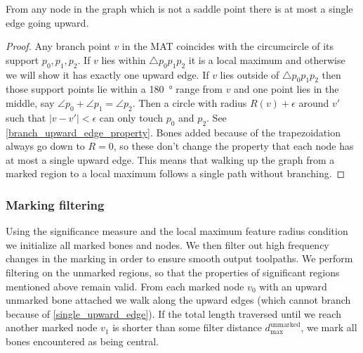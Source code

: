 \begin{lemma}\label{single_upward_edge}
From any node in the graph which is not a saddle point there is at most a single edge going upward.
\end{lemma}
\begin{proof}
Any branch point $v$ in the MAT coincides with the circumcircle of its support $p_0, p_1, p_2$.
If $v$ lies within $\triangle p_0 p_1 p_2$ it is a local maximum and otherwise we will show it has exactly one upward edge.
If $v$ lies outside of $\triangle p_0 p_1 p_2$ then those support points lie within a \SI{180}{\degree} range from $v$
and one point lies in the middle, say $\angle p_0 + \angle p_1 = \angle p_2$.
Then a circle with radius $R(v) + \epsilon$ around $v'$ such that $|v-v'| < \epsilon$ can only touch $p_0$ and $p_2$.
See \cref{branch_upward_edge_property}.
Bones added because of the trapezoidation always go down to $R=0$, so these don't change the property that each node has at most a single upward edge.
This means that walking up the graph from a marked region to a local maximum follows a single path without branching.
\end{proof}

\subsubsection{Marking filtering}
Using the significance measure and the local maximum feature radius condition we initialize all marked bones and nodes.
We then filter out high frequency changes in the marking in order to ensure smooth output toolpaths. 
We perform filtering on the unmarked regions, so that the properties of significant regions mentioned above remain valid.
From each marked node $v_0$ with an upward unmarked bone attached we walk along the upward edges (which cannot branch because of \cref{single_upward_edge}).
If the total length traversed until we reach another marked node $v_1$ is shorter than some filter distance $d_\text{max}^\text{unmarked}$, we mark all bones encountered as being central.





